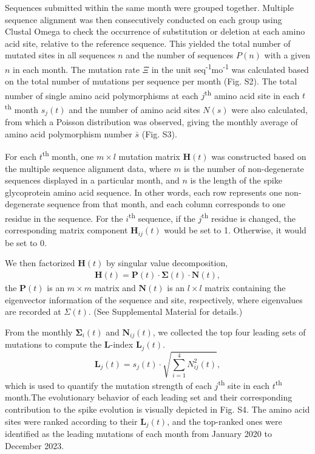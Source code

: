 \documentclass[aps,prl,amsmath,amssymb,floatfix,twocolumn, amsmath, superscriptaddress, onecolumn]{revtex4}
\begin{document}
Sequences submitted within the same month were grouped together. Multiple sequence alignment was then consecutively conducted on each group using Clustal Omega to check the occurrence of substitution or deletion at each amino acid site,\cite{clustal} relative to the reference sequence. This yielded the total number of mutated sites in all sequences $\bm{\mathit{n}}$ and the number of sequences $P(\bm{\mathit{n}})$ with a given $\bm{\mathit{n}}$ in each month. The mutation rate $\Xi$ in the unit seq\textsuperscript{-1}mo\textsuperscript{-1} was calculated based on the total number of mutations per sequence per month (Fig. S2). The total number of single amino acid polymorphisms at each $j$\textsuperscript{th} amino acid site in each $t$\textsuperscript{th} month $\bm{\mathit{s}}_j{(t)}$ and the number of amino acid sites $N(\bm{\mathit{s}})$ were also calculated, from which a Poisson distribution was observed, giving the monthly average of amino acid polymorphism number $\bm{\mathit{\bar{s}}}$ (Fig. S3).

For each $t$\textsuperscript{th} month, one $m\times l$ mutation matrix $\bm{H}{(t)}$ was constructed based on the multiple sequence alignment data, where $m$ is the number of non-degenerate sequences displayed in a particular month, and $n$ is the length of the spike glycoprotein amino acid sequence. In other words, each row represents one non-degenerate sequence from that month, and each column corresponds to one residue in the sequence. For the $i$\textsuperscript{th} sequence, if the $j$\textsuperscript{th} residue is changed, the corresponding matrix component $\bm{H}_{ij}{(t)}$ would be set to 1. Otherwise, it would be set to 0.

We then factorized $\bm{H}{(t)}$ by singular value decomposition,\cite{svd_nu}
\begin{align}
\bm{H}{(t)}=\bm{P}(t) \cdot \bm{\Sigma}(t)\cdot\bm{N}{(t)},
\end{align}
the $\bm{P}(t)$ is an $m\times m$ matrix and $\bm{N}(t)$ is an $l\times l$ matrix containing the eigenvector information of the sequence and site, respectively, where eigenvalues are recorded at $\Sigma(t)$. (See Supplemental Material for details.)

From the monthly $\bm{\Sigma}_{i}(t)$ and $\bm{N}_{ij}(t)$, we collected the top four leading sets of mutations to compute the $\bm{L}$-index $\bm{L}_{j}{(t)}$.
\begin{equation}
    \bm{L}_{j}{(t)}= \bm{\mathit{s}}_{j}{(t)}\cdot \sqrt{\sum^4_{i=1}\bm{\mathit{{N}}}^2_{ij}{(t)}},
\end{equation}
which is used to quantify the mutation strength of each $j$\textsuperscript{th} site in each $t$\textsuperscript{th} month.The evolutionary behavior of each leading set and their corresponding contribution to the spike evolution is visually depicted in Fig. S4. The amino acid sites were ranked according to their $\bm{L}_{j}{(t)}$, and the top-ranked ones were identified as the leading mutations of each month from January 2020 to December 2023. 
\end{document}
